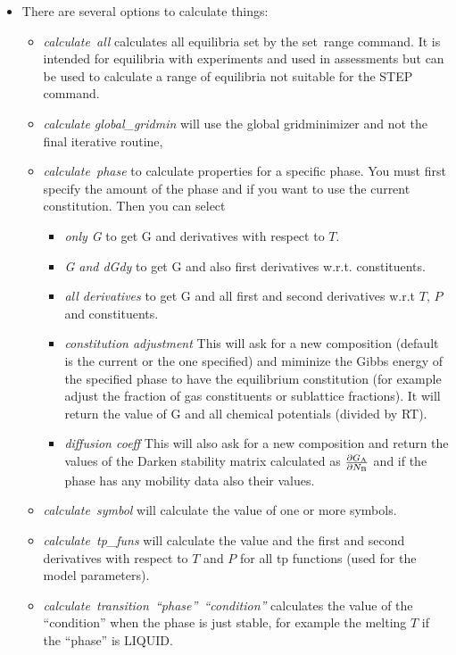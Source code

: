 \documentclass[12pt]{article}
\begin{document}
\begin{itemize}
\item There are several options to calculate things:
  \begin{itemize} 
  \item {\em calculate~all} calculates all equilibria set by the {\rm
    set~range} command.  It is intended for equilibria with
    experiments and used in assessments but can be used to calculate a
    range of equilibria not suitable for the STEP command.
  \item {\em calculate global\_gridmin} will use the global
    gridminimizer and not the final iterative routine,
  \item {\em calculate~phase} to calculate properties for a specific phase.
    You must first specify the amount of the phase and if you want to
    use the current constitution.  Then you can select
    \begin{itemize}
    \item {\em only G} to get G and derivatives with respect to $T$.
    \item {\em G and dGdy} to get G and also first derivatives
      w.r.t. constituents.
    \item {\em all derivatives} to get G and all first and second
      derivatives w.r.t $T$, $P$ and constituents.
    \item {\em constitution adjustment} This will ask for a new
      composition (default is the current or the one specified) and
      miminize the Gibbs energy of the specified phase to have the
      equilibrium constitution (for example adjust the fraction of gas
      constituents or sublattice fractions).  It will return the value
      of G and all chemical potentials (divided by RT).
    \item {\em diffusion coeff} This will also ask for a new
      composition and return the values of the Darken stability matrix
      calculated as $\frac{\partial G_{\rm A}}{\partial N_{\rm B}}$
      and if the phase has any mobility data also their values.
    \end{itemize}
  \item {\em calculate~symbol} will calculate the value of one or more
    symbols.
  \item {\em calculate~tp\_funs} will calculate the value and the
    first and second derivatives with respect to $T$ and $P$ for all
    tp functions (used for the model parameters).
  \item {\em calculate~transition~``phase''~``condition''} calculates
    the value of the ``condition'' when the phase is just stable, for
    example the melting $T$ if the ``phase'' is LIQUID.
  \end{itemize}
\end{itemize}
\end{document}
